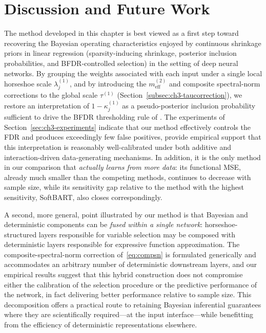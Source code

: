 {%

\section{Discussion and Future Work}
\label{sec:ch3-discussion}

The method developed in this chapter is best viewed as a first step
toward recovering the Bayesian operating characteristics enjoyed by
continuous shrinkage priors in linear regression (sparsity-inducing
shrinkage, posterior inclusion probabilities, and BFDR-controlled
selection) in the setting of deep neural networks.  By grouping the
weights associated with each input under a single local horseshoe
scale $\lambda_j^{(1)}$, and by introducing the $m_\mathrm{eff}^{(2)}$
and composite spectral-norm corrections to the global scale
$\tau^{(1)}$ (Section~\ref{subsec:ch3-taucorrection}), we restore an
interpretation of $1 - \kappa_j^{(1)}$ as a pseudo-posterior
inclusion probability sufficient to drive the BFDR thresholding rule
of \citet{bernardo_fdr_2007}.  The experiments of
Section~\ref{sec:ch3-experiments} indicate that our method effectively controls the FDR and produces exceedingly few false positives, 
provide empirical support that
this interpretation is reasonably well-calibrated under both
additive and interaction-driven data-generating mechanisms.  
In addition, it is the only method in our comparison that
\emph{actually learns from more data}: its functional MSE, already much smaller than the competing methods, continues to decrease with sample size, while its sensitivity gap relative to the method with the highest sensitivity, SoftBART, also closes correspondingly.

A second, more general, point illustrated by our method is that
Bayesian and deterministic components can be \emph{fused within a
single network}: horseshoe-structured layers responsible for
variable selection may be composed with deterministic layers
responsible for expressive function approximation.  The
composite-spectral-norm correction of~\eqref{eq:compsn} is
formulated generically and accommodates an arbitrary number of
deterministic downstream layers, and our empirical results suggest
that this hybrid construction does not compromise either the
calibration of the selection procedure or the predictive
performance of the network, in fact delivering better performance relative to sample size.  This decomposition offers a
practical route to retaining Bayesian inferential guarantees where
they are scientifically required---at the input interface---while
benefitting from the efficiency of deterministic representations
elsewhere.

}
